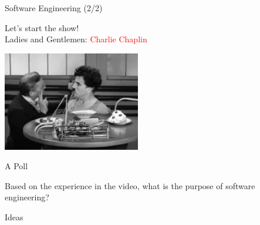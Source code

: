 \documentclass{beamer}
\begin{document}
\begin{frame}{\centerline{Software Engineering (2/2)}}
\begin{center}
\Large
Let's start the show!\\
\vspace*{0.5cm}
Ladies and Gentlemen: \textcolor{red}{Charlie Chaplin}
\end{center}
\begin{center}
\includegraphics[width=60mm]{A2022.IDSEPC.ProcessoDiProduzione/Chaplin_ModernTimes.png}
\end{center}

\end{frame}



\begin{frame}{\centerline{A Poll}}
\begin{center}
Based on the experience in the video, what is the purpose of software engineering?
\end{center}
\end{frame}

\begin{frame}{\centerline{Ideas}}
\noindent\makebox[\linewidth]{\rule{\paperwidth}{0.4pt}}\\
\vspace{0.5cm}

\noindent\makebox[\linewidth]{\rule{\paperwidth}{0.4pt}}\\
\vspace{0.5cm}

\noindent\makebox[\linewidth]{\rule{\paperwidth}{0.4pt}}\\
\vspace{0.5cm}

\noindent\makebox[\linewidth]{\rule{\paperwidth}{0.4pt}}\\
\vspace{0.5cm}

\noindent\makebox[\linewidth]{\rule{\paperwidth}{0.4pt}}\\
\vspace{0.5cm}

\noindent\makebox[\linewidth]{\rule{\paperwidth}{0.4pt}}\\
\vspace{0.5cm}

\noindent\makebox[\linewidth]{\rule{\paperwidth}{0.4pt}}\\

\end{frame}
\end{document}
